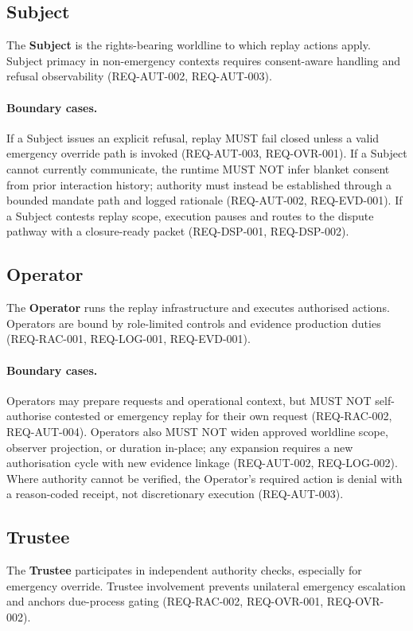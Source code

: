 \documentclass[11pt]{article}
\theoremstyle{definition}
\theoremstyle{plain}
\theoremstyle{remark}
\begin{document}
\subsection{Subject}
The \textbf{Subject} is the rights-bearing worldline to which replay actions apply.
Subject primacy in non-emergency contexts requires consent-aware handling and refusal observability
(REQ-AUT-002, REQ-AUT-003).

\paragraph{Boundary cases.}
If a Subject issues an explicit refusal, replay MUST fail closed unless a valid emergency override
path is invoked (REQ-AUT-003, REQ-OVR-001). If a Subject cannot currently communicate, the runtime
MUST NOT infer blanket consent from prior interaction history; authority must instead be established
through a bounded mandate path and logged rationale (REQ-AUT-002, REQ-EVD-001). If a Subject
contests replay scope, execution pauses and routes to the dispute pathway with a closure-ready packet
(REQ-DSP-001, REQ-DSP-002).

\subsection{Operator}
The \textbf{Operator} runs the replay infrastructure and executes authorised actions.
Operators are bound by role-limited controls and evidence production duties (REQ-RAC-001, REQ-LOG-001, REQ-EVD-001).

\paragraph{Boundary cases.}
Operators may prepare requests and operational context, but MUST NOT self-authorise contested or
emergency replay for their own request (REQ-RAC-002, REQ-AUT-004). Operators also MUST NOT widen
approved worldline scope, observer projection, or duration in-place; any expansion requires a new
authorisation cycle with new evidence linkage (REQ-AUT-002, REQ-LOG-002). Where authority cannot be
verified, the Operator's required action is denial with a reason-coded receipt, not discretionary
execution (REQ-AUT-003).

\subsection{Trustee}
The \textbf{Trustee} participates in independent authority checks, especially for emergency override.
Trustee involvement prevents unilateral emergency escalation and anchors due-process gating
(REQ-RAC-002, REQ-OVR-001, REQ-OVR-002).
\end{document}
